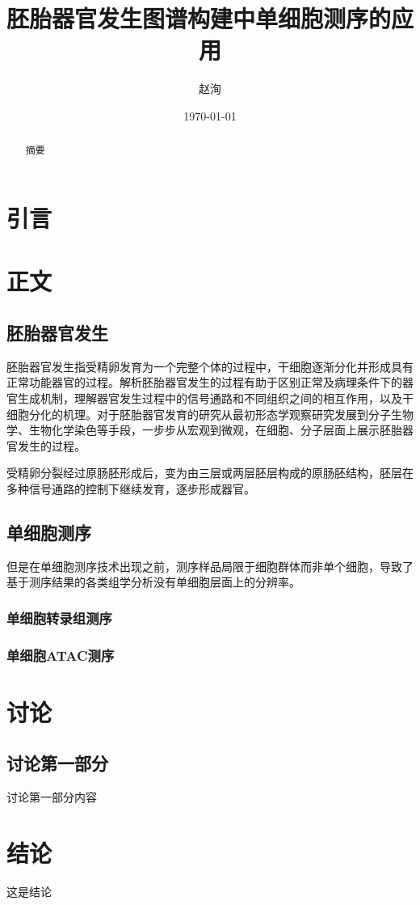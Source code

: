 \documentclass[lang=cn]{elegantpaper}
\title{胚胎器官发生图谱构建中单细胞测序的应用}
\author{赵洵}
\institute{中国科学院大学}
\date{\today}
\begin{document}
    \maketitle

    \renewcommand{\abstractname}{摘要}
    \begin{abstract}
        摘要
    \end{abstract}

	\section{引言}

    \section{正文}
		\subsection{胚胎器官发生}
        胚胎器官发生指受精卵发育为一个完整个体的过程中，干细胞逐渐分化并形成具有正常功能器官的过程。解析胚胎器官发生的过程有助于区别正常及病理条件下的器官生成机制，理解器官发生过程中的信号通路和不同组织之间的相互作用，以及干细胞分化的机理\citep{belle_tridimensional_2017, lancaster_organogenesis_2014}。对于胚胎器官发育的研究从最初形态学观察研究发展到分子生物学、生物化学染色等手段，一步步从宏观到微观，在细胞、分子层面上展示胚胎器官发生的过程。
        
        受精卵分裂经过原肠胚形成后，变为由三层或两层胚层构成的原肠胚结构，胚层在多种信号通路的控制下继续发育，逐步形成器官\citep{zorn_vertebrate_2009}。
        \subsection{单细胞测序}
        但是在单细胞测序技术出现之前，测序样品局限于细胞群体而非单个细胞，导致了基于测序结果的各类组学分析没有单细胞层面上的分辨率\citep{potter_single-cell_2018}。
            \subsubsection{单细胞转录组测序}
            \subsubsection{单细胞ATAC测序}
	\section{讨论}
        \subsection{讨论第一部分}
            讨论第一部分内容
	\section{结论}
        这是结论
    
\end{document}
